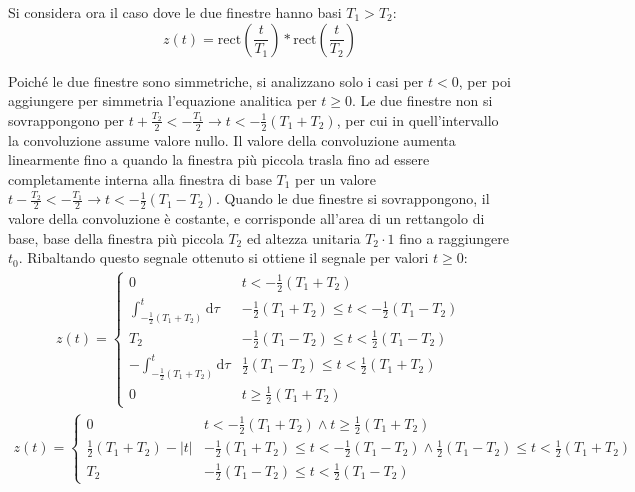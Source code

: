 \documentclass{article}
\newcommand{\rect}{\mbox{rect}}
\newcommand{\df}{\mathrm{d}}
\begin{document}
Si considera ora il caso dove le due finestre hanno basi $T_1>T_2$:
\begin{equation*}
    z(t)=\rect\left(\displaystyle\frac{t}{T_1}\right)*\rect\left(\frac{t}{T_2}\right)
\end{equation*}

Poiché le due finestre sono simmetriche, si analizzano solo i casi per $t<0$, per poi aggiungere per simmetria l'equazione analitica per $t\geq0$. Le due finestre non si 
sovrappongono per $t+\displaystyle\frac{T_2}{2}<-\frac{T_1}{2}\to t<-\frac{1}{2}(T_1+T_2)$, per cui in quell'intervallo la convoluzione assume valore nullo. Il valore 
della convoluzione aumenta linearmente fino a quando la finestra più piccola trasla fino ad essere completamente interna alla finestra di base $T_1$ per un valore 
$t-\displaystyle\frac{T_2}{2}<-\frac{T_1}{2}\to t<-\frac{1}{2}(T_1-T_2)$. Quando le due finestre si sovrappongono, il valore della convoluzione è costante, e corrisponde 
all'area di un rettangolo di base, base della finestra più piccola $T_2$ ed altezza unitaria $T_2\cdot1$ fino a raggiungere $t_0$. Ribaltando questo segnale ottenuto 
si ottiene il segnale per valori $t\geq0$:
\begin{gather*}
    z(t)=\begin{cases}
        0&t<-\displaystyle\frac{1}{2}(T_1+T_2)\\
        \displaystyle\int_{-\frac{1}{2}(T_1+T_2)}^t\df\tau&-\frac{1}{2}(T_1+T_2)\leq t <-\frac{1}{2}(T_1-T_2)\\
        T_2&-\frac{1}{2}(T_1-T_2)\leq t<\frac{1}{2}(T_1-T_2)\\
        -\displaystyle\int_{-\frac{1}{2}(T_1+T_2)}^t\df\tau&\frac{1}{2}(T_1-T_2)\leq t <\frac{1}{2}(T_1+T_2)\\
        0&t\geq\displaystyle\frac{1}{2}(T_1+T_2)
    \end{cases}
\end{gather*}
\begin{gather}
    z(t)=\begin{cases}
        0&t<-\displaystyle\frac{1}{2}(T_1+T_2)\land t\geq\frac{1}{2}(T_1+T_2)\\
        \displaystyle\frac{1}{2}(T_1+T_2)-|t| &-\frac{1}{2}(T_1+T_2)\leq t <-\frac{1}{2}(T_1-T_2)\land \frac{1}{2}(T_1-T_2)\leq t <\frac{1}{2}(T_1+T_2)\\
        T_2&-\displaystyle\frac{1}{2}(T_1-T_2)\leq t<\frac{1}{2}(T_1-T_2)
    \end{cases}
\end{gather}
\end{document}
